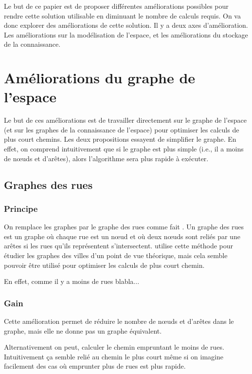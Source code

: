 \documentclass[a4paper]{article}
\begin{document}
Le but de ce papier est de proposer différentes améliorations possibles pour
rendre cette solution utilisable en diminuant le nombre de calculs requis. On
va donc explorer des améliorations de cette solution. Il y a deux axes
d'amélioration. Les améliorations sur la modélisation de l'espace, et les
améliorations du stockage de la connaissance.

\section{Améliorations du graphe de l'espace}

Le but de ces améliorations est de travailler directement sur le graphe de
l'espace (et sur les graphes de la connaissance de l'espace) pour optimiser les
calculs de plus court chemins. Les deux propositions essayent de simplifier le
graphe. En effet, on comprend intuitivement que si le graphe est plus simple
(i.e., il a moins de nœuds et d'arêtes), alors l'algorithme sera plus rapide à
exécuter.

  \subsection{Graphes des rues}

    \subsubsection{Principe}

On remplace les graphes par le graphe des rues comme fait \cite{porta2005}. Un
graphe des rues est un graphe où chaque rue est un nœud et où deux nœuds sont
reliés par une arêtes si les rues qu'ils représentent s'intersectent.
\cite{porta2005} utilise cette méthode pour étudier les graphes des villes d'un
point de vue théorique, mais cela semble pouvoir être utilisé pour optimiser les
calculs de plus court chemin.


En effet, comme il y a moins de rues blabla...

    \subsubsection{Gain}

Cette amélioration permet de réduire le nombre de nœuds et d'arêtes dans le
graphe, mais elle ne donne pas un graphe équivalent.

Alternativement on peut, calculer le chemin empruntant le moins de rues.
Intuitivement ça semble relié au chemin le plus court même si on imagine
facilement des cas où emprunter plus de rues est plus rapide.
\end{document}
